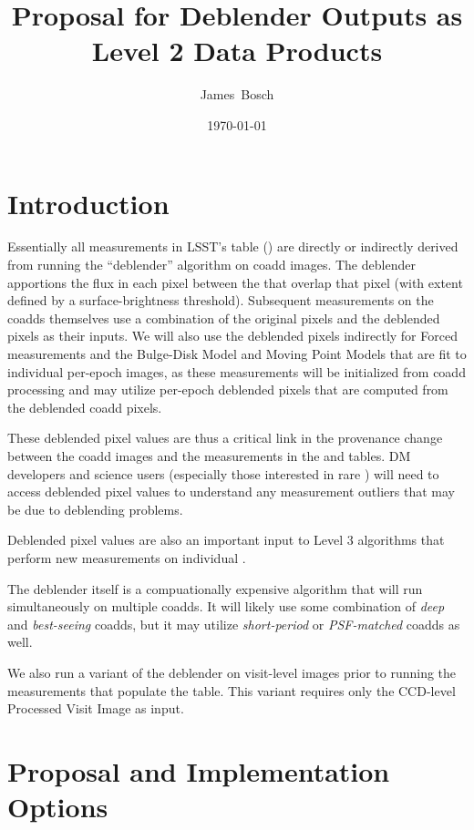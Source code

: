 \documentclass[DM,lsstdraft,toc]{lsstdoc}
\title[Deblender Data Products]{Proposal for Deblender Outputs as Level 2 Data Products}
\author{
James~Bosch
}
\date{\today}
\begin{document}
\maketitle

\section{Introduction}

Essentially all measurements in LSST's \Object table (\DPDD) are directly or indirectly derived from running the ``deblender'' algorithm on coadd images.  The deblender apportions the flux in each pixel between the \Objects that overlap that pixel (with \Object extent defined by a surface-brightness threshold).  Subsequent measurements on the coadds themselves use a combination of the original pixels and the deblended pixels as their inputs.  We will also use the deblended pixels indirectly for Forced \Source measurements and the Bulge-Disk Model and Moving Point \Source Models that are fit to individual per-epoch images, as these measurements will be initialized from coadd processing and may utilize per-epoch deblended pixels that are computed from the deblended coadd pixels.

These deblended pixel values are thus a critical link in the provenance change between the coadd images and the measurements in the \Object and \ForcedSource tables.  DM developers and science users (especially those interested in rare \Objects) will need to access deblended pixel values to understand any measurement outliers that may be due to deblending problems.

Deblended pixel values are also an important input to Level 3 algorithms that perform new measurements on individual \Objects.

The deblender itself is a compuationally expensive algorithm that will run simultaneously on multiple coadds.  It will likely use some combination of \emph{deep} and \emph{best-seeing} coadds, but it may utilize \emph{short-period} or \emph{PSF-matched} coadds as well.

We also run a variant of the deblender on visit-level images prior to running the measurements that populate the \Source table.  This variant requires only the CCD-level Processed Visit Image as input.

\section{Proposal and Implementation Options}
\end{document}
